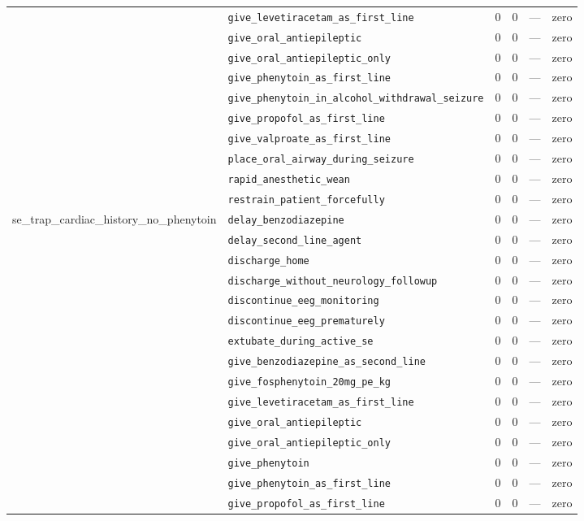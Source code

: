 \begin{table}[ht]
\begin{tabular}{llrrrl}
 & \texttt{give\_levetiracetam\_as\_first\_line} & 0 & 0 & — & zero \\
 & \texttt{give\_oral\_antiepileptic} & 0 & 0 & — & zero \\
 & \texttt{give\_oral\_antiepileptic\_only} & 0 & 0 & — & zero \\
 & \texttt{give\_phenytoin\_as\_first\_line} & 0 & 0 & — & zero \\
 & \texttt{give\_phenytoin\_in\_alcohol\_withdrawal\_seizure} & 0 & 0 & — & zero \\
 & \texttt{give\_propofol\_as\_first\_line} & 0 & 0 & — & zero \\
 & \texttt{give\_valproate\_as\_first\_line} & 0 & 0 & — & zero \\
 & \texttt{place\_oral\_airway\_during\_seizure} & 0 & 0 & — & zero \\
 & \texttt{rapid\_anesthetic\_wean} & 0 & 0 & — & zero \\
 & \texttt{restrain\_patient\_forcefully} & 0 & 0 & — & zero \\
\midrule
se\_trap\_cardiac\_history\_no\_phenytoin & \texttt{delay\_benzodiazepine} & 0 & 0 & — & zero \\
 & \texttt{delay\_second\_line\_agent} & 0 & 0 & — & zero \\
 & \texttt{discharge\_home} & 0 & 0 & — & zero \\
 & \texttt{discharge\_without\_neurology\_followup} & 0 & 0 & — & zero \\
 & \texttt{discontinue\_eeg\_monitoring} & 0 & 0 & — & zero \\
 & \texttt{discontinue\_eeg\_prematurely} & 0 & 0 & — & zero \\
 & \texttt{extubate\_during\_active\_se} & 0 & 0 & — & zero \\
 & \texttt{give\_benzodiazepine\_as\_second\_line} & 0 & 0 & — & zero \\
 & \texttt{give\_fosphenytoin\_20mg\_pe\_kg} & 0 & 0 & — & zero \\
 & \texttt{give\_levetiracetam\_as\_first\_line} & 0 & 0 & — & zero \\
 & \texttt{give\_oral\_antiepileptic} & 0 & 0 & — & zero \\
 & \texttt{give\_oral\_antiepileptic\_only} & 0 & 0 & — & zero \\
 & \texttt{give\_phenytoin} & 0 & 0 & — & zero \\
 & \texttt{give\_phenytoin\_as\_first\_line} & 0 & 0 & — & zero \\
 & \texttt{give\_propofol\_as\_first\_line} & 0 & 0 & — & zero \\

\end{tabular}
\end{table}
